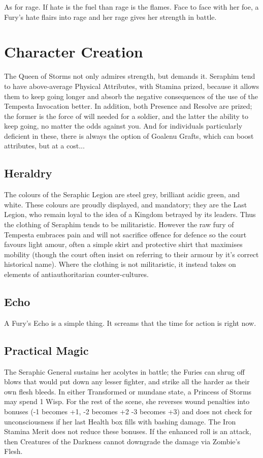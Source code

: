 As for rage. If hate is the fuel than rage is the flames. Face to face with her foe, a Fury's hate flairs into rage and her rage gives her strength in battle. 

\section*{Character Creation}
The Queen of Storms not only admires strength, but demands it. Seraphim tend to have above-average Physical Attributes, with Stamina prized, because it allows them to keep going longer and absorb the negative consequences of the use of the Tempesta Invocation better. In addition, both Presence and Resolve are prized; the former is the force of will needed for a soldier, and the latter the ability to keep going, no matter the odds against you. And for individuals particularly deficient in these, there is always the option of Goalenu Grafts, which can boost attributes, but at a cost... 

\subsection*{Heraldry}
The colours of the Seraphic Legion are steel grey, brilliant acidic green, and white. These colours are proudly displayed, and mandatory; they are the Last Legion, who remain loyal to the idea of a Kingdom betrayed by its leaders. Thus the clothing of Seraphim tends to be militaristic. However the raw fury of Tempesta embraces pain and will not sacrifice offence for defence so the court favours light amour, often a simple skirt and protective shirt that maximises mobility (though the court often insist on referring to their armour by it's correct historical name). Where the clothing is not militaristic, it instead takes on elements of antiauthoritarian counter-cultures. 


\subsection*{Echo}
A Fury's Echo is a simple thing. It screams that the time for action is right now. 

\subsection*{Practical Magic}
The Seraphic General sustains her acolytes in battle; the Furies can shrug off blows that would put down any lesser fighter, and strike all the harder as their own flesh bleeds. In either Transformed or mundane state, a Princess of Storms may spend 1 Wisp. For the rest of the scene, she reverses wound penalties into bonuses (-1 becomes +1, -2 becomes +2 -3 becomes +3) and does not check for unconsciousness if her last Health box fills with bashing damage. The Iron Stamina Merit does not reduce these bonuses. If the enhanced roll is an attack, then Creatures of the Darkness cannot downgrade the damage via Zombie's Flesh. 

